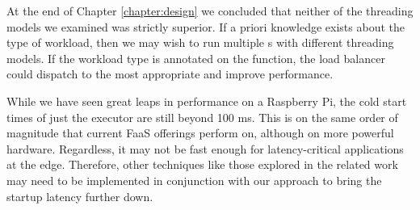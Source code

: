 At the end of Chapter \ref{chapter:design} we concluded that neither of the threading models we examined was strictly superior. If a priori knowledge exists about the type of workload, then we may wish to run multiple s with different threading models. If the workload type is annotated on the function, the load balancer could dispatch to the most appropriate  and improve performance.

While we have seen great leaps in performance on a Raspberry Pi, the cold start times of just the executor are still beyond 100 ms. This is on the same order of magnitude that current FaaS offerings perform on, although on more powerful hardware. Regardless, it may not be fast enough for latency-critical applications at the edge. Therefore, other techniques like those explored in the related work may need to be implemented in conjunction with our approach to bring the startup latency further down.

